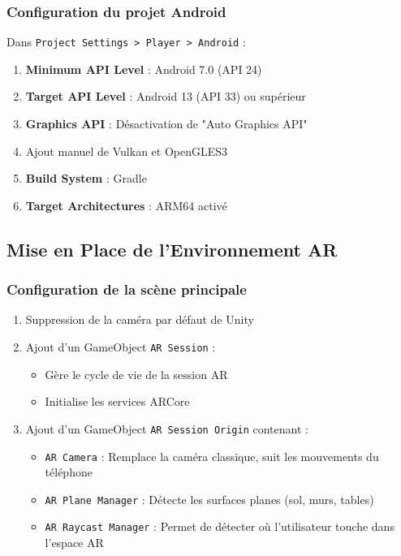 \documentclass[12pt,a4paper]{article}
\begin{document}
\subsubsection{Configuration du projet Android}

Dans \texttt{Project Settings > Player > Android} :

\begin{enumerate}
    \item \textbf{Minimum API Level} : Android 7.0 (API 24)
    \item \textbf{Target API Level} : Android 13 (API 33) ou supérieur
    \item \textbf{Graphics API} : Désactivation de "Auto Graphics API"
    \item Ajout manuel de Vulkan et OpenGLES3
    \item \textbf{Build System} : Gradle
    \item \textbf{Target Architectures} : ARM64 activé
\end{enumerate}

\subsection{Mise en Place de l'Environnement AR}

\subsubsection{Configuration de la scène principale}

\begin{enumerate}
    \item Suppression de la caméra par défaut de Unity
    \item Ajout d'un GameObject \texttt{AR Session} :
    \begin{itemize}
        \item Gère le cycle de vie de la session AR
        \item Initialise les services ARCore
    \end{itemize}
    \item Ajout d'un GameObject \texttt{AR Session Origin} contenant :
    \begin{itemize}
        \item \texttt{AR Camera} : Remplace la caméra classique, suit les mouvements du téléphone
        \item \texttt{AR Plane Manager} : Détecte les surfaces planes (sol, murs, tables)
        \item \texttt{AR Raycast Manager} : Permet de détecter où l'utilisateur touche dans l'espace AR
    \end{itemize}
\end{enumerate}
\end{document}

